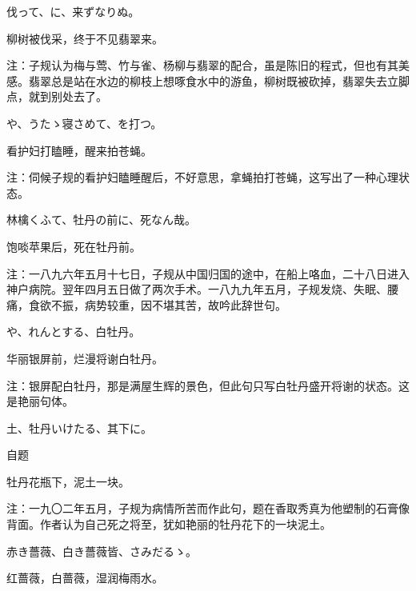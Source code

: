 \begin{haiku}
    {\FH {}伐って、に、来ずなりぬ。}

    {\FK 柳树被伐采，终于不见翡翠来。}

    {\FT 注：子规认为梅与莺、竹与雀、杨柳与翡翠的配合，虽是陈旧的程式，但也有其美感。翡翠总是站在水边的柳枝上想啄食水中的游鱼，柳树既被砍掉，翡翠失去立脚点，就到别处去了。}
\end{haiku}

\begin{haiku}
    {\FH {}や、うたゝ寝さめて、を打つ。}

    {\FK 看护妇打瞌睡，醒来拍苍蝇。}

    {\FT 注：伺候子规的看护妇瞌睡醒后，不好意思，拿蝇拍打苍蝇，这写出了一种心理状态。}
\end{haiku}

\begin{haiku}
    {\FH 林檎くふて、牡丹の前に、死なん哉。}

    {\FK 饱啖苹果后，死在牡丹前。}

    {\FT 注：一八九六年五月十七日，子规从中国归国的途中，在船上咯血，二十八日进入神户病院。翌年四月五日做了两次手术。一八九九年五月，子规发烧、失眠、腰痛，食欲不振，病势较重，因不堪其苦，故吟此辞世句。}
\end{haiku}

\begin{haiku}
    {\FH {}や、れんとする、白牡丹。}

    {\FK 华丽银屏前，烂漫将谢白牡丹。}

    {\FT 注：银屏配白牡丹，那是满屋生辉的景色，但此句只写白牡丹盛开将谢的状态。这是艳丽句体。}
\end{haiku}

\begin{haiku}
    {\FH 土、牡丹いけたる、其下に。}

    {\FK 自题}

    {\FK 牡丹花瓶下，泥土一块。}

    {\FT 注：一九〇二年五月，子规为病情所苦而作此句，题在香取秀真为他塑制的石膏像背面。作者认为自己死之将至，犹如艳丽的牡丹花下的一块泥土。}
\end{haiku}

\begin{haiku}
    {\FH 赤き薔薇、白き薔薇皆、さみだるゝ。}

    {\FK 红蔷薇，白蔷薇，湿润梅雨水。}
\end{haiku}

